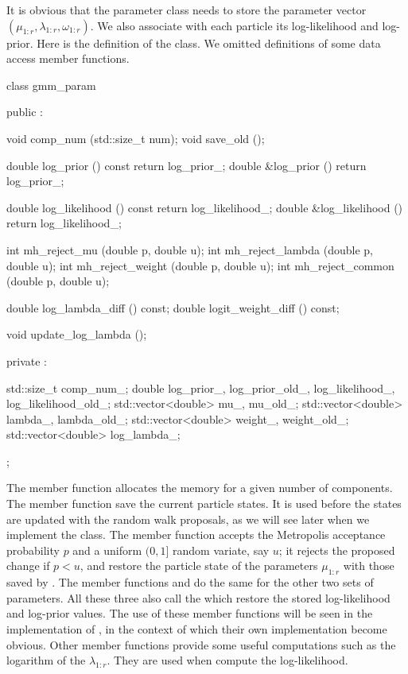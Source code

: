 \documentclass[11pt, fontset=Minion, showoverfull,
bib, mintcode, minted=cache]{marticle}
\begin{document}
It is obvious that the parameter class  needs to store
the parameter vector $(\mu_{1:r},\lambda_{1:r},\omega_{1:r})$. We also
associate with each particle its log-likelihood and log-prior. Here is the
definition of the  class. We omitted definitions of some
data access member functions.
\begin{cppcode}
class gmm_param
{
    public :

    void comp_num (std::size_t num);
    void save_old ();

    double log_prior () const {return log_prior_;}
    double &log_prior () {return log_prior_;}

    double log_likelihood () const {return log_likelihood_;}
    double &log_likelihood () {return log_likelihood_;}

    int mh_reject_mu (double p, double u);
    int mh_reject_lambda (double p, double u);
    int mh_reject_weight (double p, double u);
    int mh_reject_common (double p, double u);

    double log_lambda_diff () const;
    double logit_weight_diff () const;

    void update_log_lambda ();

    private :

    std::size_t comp_num_;
    double log_prior_, log_prior_old_, log_likelihood_, log_likelihood_old_;
    std::vector<double> mu_, mu_old_;
    std::vector<double> lambda_, lambda_old_;
    std::vector<double> weight_, weight_old_;
    std::vector<double> log_lambda_;
};
\end{cppcode}
The  member function allocates the memory for a given
number of components. The  member function save the
current particle states. It is used before the states are updated with the
random walk proposals, as we will see later when we implement the
 class. The  member function
accepts the Metropolis acceptance probability $p$ and a uniform $(0,1]$ random
variate, say $u$; it rejects the proposed change if $p < u$, and restore the
particle state of the parameters $\mu_{1:r}$ with those saved by
. The member functions  and
 do the same for the other two sets of parameters.
All these three also call the  which restore the
stored log-likelihood and log-prior values. The use of these member functions
will be seen in the implementation of , in the context
of which their own implementation become obvious. Other member functions
provide some useful computations such as the logarithm of the $\lambda_{1:r}$.
They are used when compute the log-likelihood.
\end{document}
